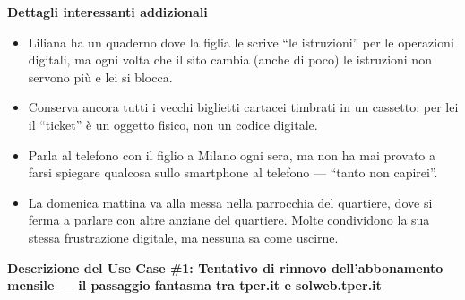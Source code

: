 ﻿\documentclass[11pt,a4paper]{article}
\begin{document}
\vspace{0.3cm}


\begin{tcolorbox}[base,colback=backgroundColor!50]
    \textbf{Dettagli interessanti addizionali} \\[4pt]
    {\small
    \begin{itemize}[leftmargin=*]
        \item Liliana ha un quaderno dove la figlia le scrive ``le istruzioni'' per le operazioni digitali, ma ogni volta che il sito cambia (anche di poco) le istruzioni non servono più e lei si blocca.
        \item Conserva ancora tutti i vecchi biglietti cartacei timbrati in un cassetto: per lei il ``ticket'' è un oggetto fisico, non un codice digitale.
        \item Parla al telefono con il figlio a Milano ogni sera, ma non ha mai provato a farsi spiegare qualcosa sullo smartphone al telefono --- ``tanto non capirei''.
        \item La domenica mattina va alla messa nella parrocchia del quartiere, dove si ferma a parlare con altre anziane del quartiere. Molte condividono la sua stessa frustrazione digitale, ma nessuna sa come uscirne.
    \end{itemize}
    }
\end{tcolorbox}

\newpage


\begin{tcolorbox}[sectionbox,colback=primaryColor!10]
    \textbf{Descrizione del Use Case \#1: Tentativo di rinnovo dell'abbonamento mensile --- il passaggio fantasma tra tper.it e solweb.tper.it}
\end{tcolorbox}

\vspace{0.3cm}
\end{document}

